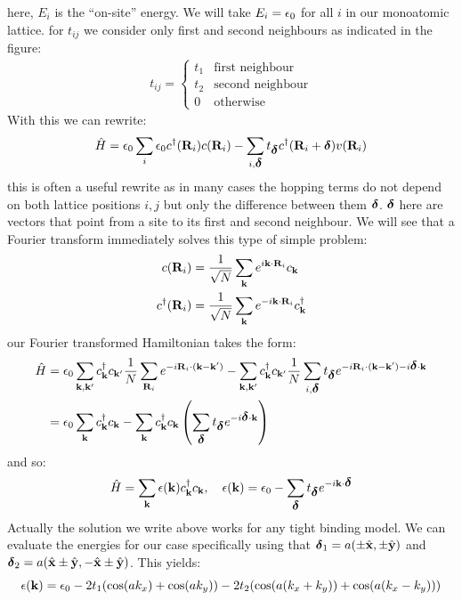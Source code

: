 here, $E_i$ is the ``on-site'' energy. We will take $E_i = \epsilon_0$ for all $i$ in our monoatomic lattice. for $t_{ij}$ we consider only first and second neighbours as indicated in the figure:
\begin{align*}
    t_{ij} = \begin{cases}
        t_1 & \text{first neighbour}
        \\ t_2 & \text{second neighbour}
        \\ 0 & \text{otherwise}
    \end{cases}
\end{align*}
With this we can rewrite:
\begin{equation}
    \hat{H} = \epsilon_0 \sum_i \epsilon_0 c^\dagger(\mathbf{R}_i)c(\mathbf{R}_i) - \sum_{i, \mbox{\boldmath$ \delta $}}t_{\mbox{\boldmath$ \delta $}}c^\dagger(\mathbf{R}_i + \mbox{\boldmath$ \delta $})v(\mathbf{R}_i)
\end{equation}
this is often a useful rewrite as in many cases the hopping terms do not depend on both lattice positions $i, j$ but only the difference between them $\mbox{\boldmath$ \delta $}$. $\mbox{\boldmath$ \delta $}$ here are vectors that point from a site to its first and second neighbour. We will see that a Fourier transform immediately solves this type of simple problem:
\begin{equation}
    \begin{split}
        c(\mathbf{R}_i) &= \frac{1}{\sqrt{N}}\sum_{\mathbf{k}}e^{i\mathbf{k} \cdot \mathbf{R}_i}c_{\mathbf{k}}
        \\ c^\dagger(\mathbf{R}_i) &= \frac{1}{\sqrt{N}}\sum_{\mathbf{k}}e^{-i\mathbf{k} \cdot \mathbf{R}_i}c^\dagger_{\mathbf{k}}
    \end{split}
\end{equation}
our Fourier transformed Hamiltonian takes the form:
\begin{equation}
    \begin{split}
        \hat{H} &= \epsilon_0\sum_{\mathbf{k}, \mathbf{k}'}c^\dagger_{\mathbf{k}}c_{\mathbf{k}'}\frac{1}{N}\sum_{\mathbf{R}_i}e^{-i\mathbf{R}_i\cdot(\mathbf{k} - \mathbf{k}')} - \sum_{\mathbf{k}, \mathbf{k}'}c^\dagger_{\mathbf{k}}c_{\mathbf{k}'}\frac{1}{N}\sum_{i, \mbox{\boldmath$ \delta $}}t_{\mbox{\boldmath$ \delta $}}e^{-i\mathbf{R}_i\cdot(\mathbf{k} - \mathbf{k}') - i\mbox{\boldmath$ \delta $}\cdot \mathbf{k}}
        \\ &= \epsilon_0\sum_{\mathbf{k}}c^\dagger_{\mathbf{k}}c_{\mathbf{k}} - \sum_{\mathbf{k}}c^\dagger_{\mathbf{k}}c_{\mathbf{k}}\left(\sum_{\mbox{\boldmath$ \delta $}}t_{\mbox{\boldmath$ \delta $}}e^{- i\mbox{\boldmath$ \delta $}\cdot \mathbf{k}}\right)
    \end{split}
\end{equation}
and so:
\begin{equation}
    \hat{H} = \sum_{\mathbf{k}}\epsilon(\mathbf{k})c^\dagger_{\mathbf{k}}c_{\mathbf{k}}, \quad \epsilon(\mathbf{k}) = \epsilon_0 - \sum_{\mbox{\boldmath$ \delta $}}t_{\mbox{\boldmath$ \delta $}}e^{-i\mathbf{k} \cdot \mbox{\boldmath$ \delta $}}
\end{equation}
Actually the solution we write above works for any tight binding model. We can evaluate the energies for our case specifically using that $\mbox{\boldmath$ \delta $}_1 = a(\pm \hat{\mathbf{x}}, \pm \hat{\mathbf{y}})$ and $\mbox{\boldmath$ \delta $}_2 = a(\hat{\mathbf{x}} \pm \hat{\mathbf{y}}, -\hat{\mathbf{x}} \pm \hat{\mathbf{y}})$. This yields:
\begin{equation}
    \epsilon(\mathbf{k}) = \epsilon_0 - 2t_1(\cos(ak_x) + \cos(ak_y)) - 2t_2(\cos(a(k_x + k_y)) + \cos(a(k_x - k_y)))
\end{equation}

